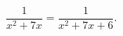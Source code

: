 \begin{ex}[type=equation]
	\begin{condition}
		$\dfrac{1}{x^2 + 7x} = \dfrac{1}{x^2 + 7x +6}.$
	\end{condition}
\end{ex}
